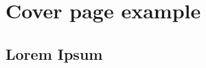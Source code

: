 \documentclass[twoside,francais]{book}
\begin{document}
\frontmatter
\frontcover

\mainmatter
\chapter{Cover page example}
\section{Lorem Ipsum}
\lipsum
\lipsum
\lipsum

\backmatter
\backcover
\end{document}
